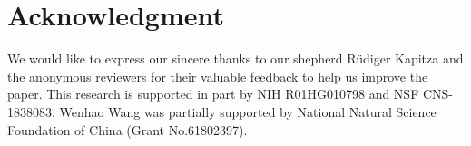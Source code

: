 \section*{Acknowledgment}

We would like to express our sincere thanks to our shepherd Rüdiger Kapitza and the anonymous reviewers for their valuable feedback to help us improve the paper. This research is supported in part by NIH R01HG010798 and NSF CNS-1838083. Wenhao Wang was partially supported by National Natural Science Foundation of China (Grant No.61802397).